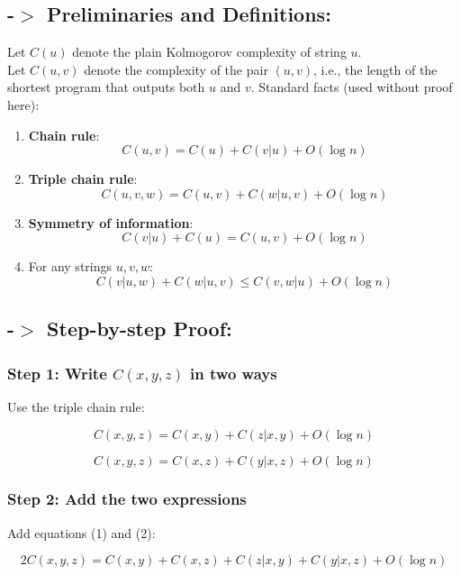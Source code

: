 \documentclass[12pt]{article}
\begin{document}
\subsection*{-$>$ Preliminaries and Definitions:}

Let $C(u)$ denote the plain Kolmogorov complexity of string $u$. \\ 
Let $C(u, v)$ denote the complexity of the pair $(u, v)$, i.e., the length of the shortest program that outputs both $u$ and $v$.
\newline
\newline
Standard facts (used without proof here):

\begin{enumerate}
    \item \textbf{Chain rule}:
    \[
    C(u, v) = C(u) + C(v|u) + O(\log n)
    \]

    \item \textbf{Triple chain rule}:
    \[
    C(u, v, w) = C(u, v) + C(w | u, v) + O(\log n)
    \]

    \item \textbf{Symmetry of information}:
    \[
    C(v|u) + C(u) = C(u, v) + O(\log n)
    \]

    \item For any strings $u, v, w$:
    \[
    C(v|u, w) + C(w|u, v) \leq C(v, w|u) + O(\log n)
    \]
\end{enumerate}

\subsection*{-$>$ Step-by-step Proof:}

\subsubsection*{Step 1: Write $C(x, y, z)$ in two ways}

Use the triple chain rule:

\[
C(x, y, z) = C(x, y) + C(z | x, y) + O(\log n) \tag{1}
\]

\[
C(x, y, z) = C(x, z) + C(y | x, z) + O(\log n) \tag{2}
\]

\subsubsection*{Step 2: Add the two expressions}

Add equations (1) and (2):

\[
2C(x, y, z) = C(x, y) + C(x, z) + C(z | x, y) + C(y | x, z) + O(\log n) \tag{3}
\]
\end{document}
